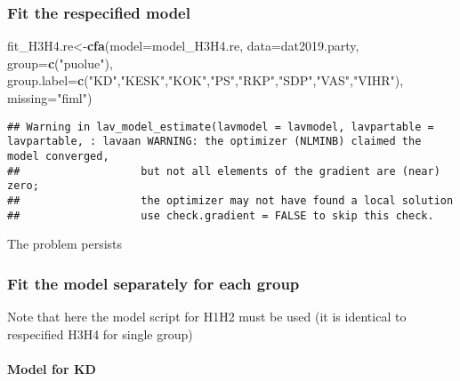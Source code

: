\documentclass[
]{article}
\newenvironment{Shaded}{\begin{snugshade}}{\end{snugshade}}
\newcommand{\DataTypeTok}[1]{\textcolor[rgb]{0.13,0.29,0.53}{#1}}
\newcommand{\KeywordTok}[1]{\textcolor[rgb]{0.13,0.29,0.53}{\textbf{#1}}}
\newcommand{\NormalTok}[1]{#1}
\newcommand{\StringTok}[1]{\textcolor[rgb]{0.31,0.60,0.02}{#1}}
\begin{document}
\hypertarget{fit-the-respecified-model}{%
\subsubsection{Fit the respecified
model}\label{fit-the-respecified-model}}

\begin{Shaded}
\begin{Highlighting}[]
\NormalTok{fit_H3H4.re<-}\KeywordTok{cfa}\NormalTok{(}\DataTypeTok{model=}\NormalTok{model_H3H4.re,}
              \DataTypeTok{data=}\NormalTok{dat2019.party,}
              \DataTypeTok{group=}\KeywordTok{c}\NormalTok{(}\StringTok{"puolue"}\NormalTok{),}
              \DataTypeTok{group.label=}\KeywordTok{c}\NormalTok{(}\StringTok{"KD"}\NormalTok{,}\StringTok{"KESK"}\NormalTok{,}\StringTok{"KOK"}\NormalTok{,}\StringTok{"PS"}\NormalTok{,}\StringTok{"RKP"}\NormalTok{,}\StringTok{"SDP"}\NormalTok{,}\StringTok{"VAS"}\NormalTok{,}\StringTok{"VIHR"}\NormalTok{),}
              \DataTypeTok{missing=}\StringTok{"fiml"}\NormalTok{)}
\end{Highlighting}
\end{Shaded}

\begin{verbatim}
## Warning in lav_model_estimate(lavmodel = lavmodel, lavpartable = lavpartable, : lavaan WARNING: the optimizer (NLMINB) claimed the model converged,
##                   but not all elements of the gradient are (near) zero;
##                   the optimizer may not have found a local solution
##                   use check.gradient = FALSE to skip this check.
\end{verbatim}

The problem persists

\newpage

\hypertarget{fit-the-model-separately-for-each-group}{%
\subsubsection{Fit the model separately for each
group}\label{fit-the-model-separately-for-each-group}}

Note that here the model script for H1H2 must be used (it is identical
to respecified H3H4 for single group)

\hypertarget{model-for-kd}{%
\paragraph{Model for KD}\label{model-for-kd}}
\end{document}
